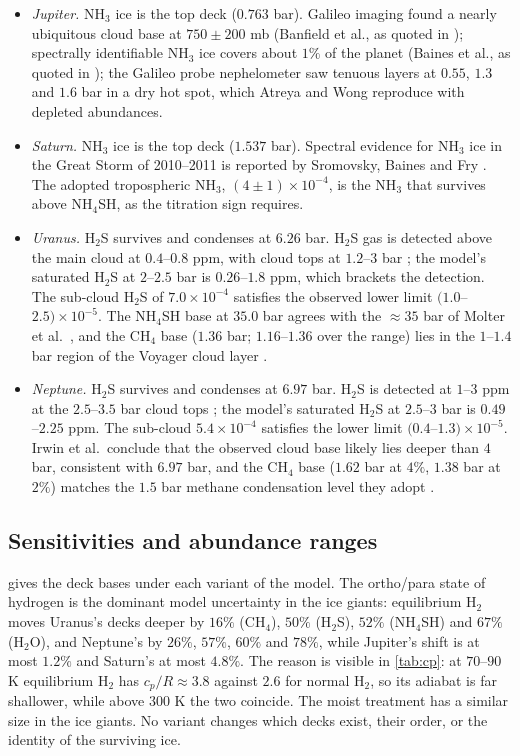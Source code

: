 \documentclass[11pt]{article}
\theoremstyle{definition}\newtheorem{definition}[theorem]{Definition}
\theoremstyle{remark}\newtheorem{remark}[theorem]{Remark}
\begin{document}
\begin{itemize}
\item \emph{Jupiter.} NH$_3$ ice is the top deck ($0.763$ bar). Galileo imaging found a nearly ubiquitous cloud base at $750\pm200$ mb (Banfield et al., as quoted in \cite{AtreyaWong}); spectrally identifiable NH$_3$ ice covers about $1\%$ of the planet (Baines et al., as quoted in \cite{AtreyaWong}); the Galileo probe nephelometer saw tenuous layers at $0.55$, $1.3$ and $1.6$ bar in a dry hot spot, which Atreya and Wong reproduce with depleted abundances.
\item \emph{Saturn.} NH$_3$ ice is the top deck ($1.537$ bar). Spectral evidence for NH$_3$ ice in the Great Storm of 2010--2011 is reported by Sromovsky, Baines and Fry \cite{Sromovsky2013}. The adopted tropospheric NH$_3$, $(4\pm1)\times10^{-4}$, is the NH$_3$ that survives above NH$_4$SH, as the titration sign requires.
\item \emph{Uranus.} H$_2$S survives and condenses at $6.26$ bar. H$_2$S gas is detected above the main cloud at $0.4$--$0.8$ ppm, with cloud tops at $1.2$--$3$ bar \cite{Irwin2018}; the model's saturated H$_2$S at $2$--$2.5$ bar is $0.26$--$1.8$ ppm, which brackets the detection. The sub-cloud H$_2$S of $7.0\times10^{-4}$ satisfies the observed lower limit $(1.0$--$2.5)\times10^{-5}$. The NH$_4$SH base at $35.0$ bar agrees with the $\approx35$ bar of Molter et al.\ \cite{Molter2021}, and the CH$_4$ base ($1.36$ bar; $1.16$--$1.36$ over the range) lies in the $1$--$1.4$ bar region of the Voyager cloud layer \cite{Atreya2020}.
\item \emph{Neptune.} H$_2$S survives and condenses at $6.97$ bar. H$_2$S is detected at $1$--$3$ ppm at the $2.5$--$3.5$ bar cloud tops \cite{Irwin2019a}; the model's saturated H$_2$S at $2.5$--$3$ bar is $0.49$--$2.25$ ppm. The sub-cloud $5.4\times10^{-4}$ satisfies the lower limit $(0.4$--$1.3)\times10^{-5}$. Irwin et al.\ conclude that the observed cloud base likely lies deeper than $4$ bar, consistent with $6.97$ bar, and the CH$_4$ base ($1.62$ bar at $4\%$, $1.38$ bar at $2\%$) matches the $1.5$ bar methane condensation level they adopt \cite{Irwin2019a}.
\end{itemize}

\subsection{Sensitivities and abundance ranges}\label{sec:ranges}
 gives the deck bases under each variant of the model. The ortho/para state of hydrogen is the dominant model uncertainty in the ice giants: equilibrium H$_2$ moves Uranus's decks deeper by $16\%$ (CH$_4$), $50\%$ (H$_2$S), $52\%$ (NH$_4$SH) and $67\%$ (H$_2$O), and Neptune's by $26\%$, $57\%$, $60\%$ and $78\%$, while Jupiter's shift is at most $1.2\%$ and Saturn's at most $4.8\%$. The reason is visible in \cref{tab:cp}: at $70$--$90$ K equilibrium H$_2$ has $c_p/R\approx3.8$ against $2.6$ for normal H$_2$, so its adiabat is far shallower, while above $300$ K the two coincide. The moist treatment has a similar size in the ice giants. No variant changes which decks exist, their order, or the identity of the surviving ice.
\end{document}
